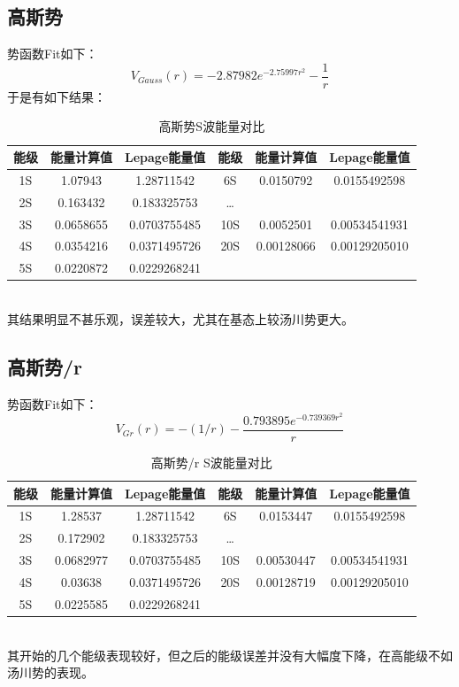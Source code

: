 \documentclass[hyperref]{ctexart}
\begin{document}
\subsection{高斯势}
势函数Fit如下：
\begin{equation}
  V_{Gauss}(r)=-2.87982 e^{-2.75997 r^2}-\frac{1}{r}
\end{equation}
于是有如下结果：
\begin{table}[!htbp]
  \centering
  \begin{tabular}{|cccccc|}
    \hline
    能级 & 能量计算值 & Lepage能量值 & 能级 & 能量计算值 & Lepage能量值 \\
    \hline
    1S & 1.07943 & 1.28711542 & 6S & 0.0150792 & 0.0155492598 \\
    2S & 0.163432 & 0.183325753  & \dots &   & \\
    3S & 0.0658655 & 0.0703755485 & 10S & 0.0052501 & 0.00534541931 \\
    4S & 0.0354216 & 0.0371495726 & 20S & 0.00128066 & 0.00129205010 \\
    5S & 0.0220872 & 0.0229268241  &  &  &  \\
    \hline
  \end{tabular}
  \caption{高斯势S波能量对比}
\end{table}\\
其结果明显不甚乐观，误差较大，尤其在基态上较汤川势更大。

\subsection{高斯势/r}
势函数Fit如下：
\begin{equation}
  V_{Gr}(r)=-(1/r) - \frac{0.793895 e^{-0.739369 r^2}}{r}
\end{equation}
\begin{table}[!htbp]
  \centering
  \begin{tabular}{|cccccc|}
    \hline
    能级 & 能量计算值 & Lepage能量值 & 能级 & 能量计算值 & Lepage能量值 \\
    \hline
    1S & 1.28537 & 1.28711542 & 6S & 0.0153447 & 0.0155492598 \\
    2S & 0.172902 & 0.183325753  & \dots &   & \\
    3S & 0.0682977 & 0.0703755485 & 10S & 0.00530447 & 0.00534541931 \\
    4S & 0.03638 & 0.0371495726 & 20S & 0.00128719 & 0.00129205010 \\
    5S & 0.0225585 & 0.0229268241  &  &  &  \\
    \hline
  \end{tabular}
  \caption{高斯势/r S波能量对比}
\end{table}\\
其开始的几个能级表现较好，但之后的能级误差并没有大幅度下降，在高能级不如汤川势的表现。
\end{document}
